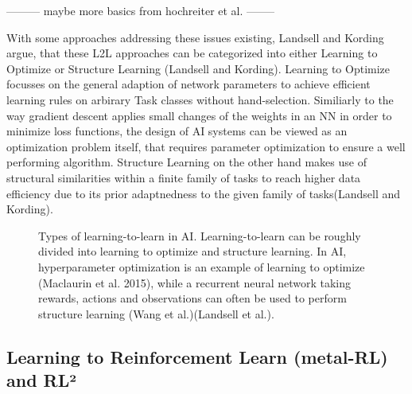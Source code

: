 \documentclass[letterpaper, 10 pt, conference]{ieeeconf}  %
\begin{document}
--------- maybe more basics from hochreiter et al. -------- \newline

With some approaches addressing these issues existing, Landsell and Kording argue, that these L2L approaches can be categorized into 
either Learning to Optimize or Structure Learning (Landsell and Kording). Learning to Optimize focusses on the general 
adaption of network parameters to achieve efficient learning rules on arbirary Task classes without hand-selection. Similiarly to the way
gradient descent applies small changes of the weights in an NN in order to minimize loss functions, the design of AI systems can be viewed as
an optimization problem itself, that requires parameter optimization to ensure a well performing algorithm. Structure Learning 
on the other hand makes use of structural similarities within a finite family of tasks to reach higher data
efficiency due to its prior adaptnedness to the given family of tasks(Landsell and Kording). \newline

\begin{figure}[thpb]
        \centering
  \caption{Types of learning-to-learn in AI. Learning-to-learn can be roughly divided into learning to optimize and structure learning.
  In AI, hyperparameter optimization is
  an example of learning to optimize (Maclaurin et al. 2015), while a recurrent neural network taking rewards, actions and observations
   can often be used to perform structure learning (Wang et al.)(Landsell et al.).}
        \label{figurelabel}
     \end{figure}


\subsection{Learning to Reinforcement Learn (metal-RL) and RL²}
\end{document}
